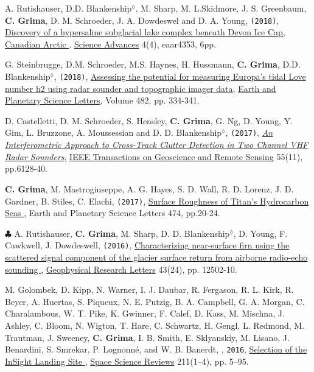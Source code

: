 \begin{etaremune}
\item
  A. Rutishauser, D.D. Blankenship$^\lozenge$, M. Sharp, M. L.Skidmore, J. S. Greenbaum, \textbf{C. Grima}, D. M. Schroeder, J. A. Dowdeswel and D. A. Young, \texttt{(2018)}, \href{http://advances.sciencemag.org/content/4/4/eaar4353}{Discovery of a hypersaline subglacial lake complex beneath Devon Ice Cap, Canadian Arctic \aiOpenAccessSquare}. \ul{Science Advances} 4(4), eaar4353, 6pp.
  
\item
  G. Steinbrugge, D.M. Schroeder, M.S. Haynes, H. Hussmann, \textbf{C. Grima}, D.D. Blankenship$^\lozenge$, \texttt{(2018)}, \href{https://www.sciencedirect.com/science/article/pii/S0012821X17306647}{Assessing the potential for measuring Europa's tidal Love number h2 using radar sounder and topographic imager data}, \ul{Earth and Planetary Science Letters}, Volume 482, pp. 334-341.
  
\item
  D. Castelletti, D. M. Schroeder, S. Hensley, \textbf{C. Grima}, G. Ng, D. Young, Y. Gim, L. Bruzzone, A. Moussessian and D. D. Blankenship$^\lozenge$, \texttt{(2017)}, \href{http://ieeexplore.ieee.org/abstract/document/8012547/}{\emph{An Interferometric Approach to Cross-Track Clutter Detection in Two Channel VHF Radar Sounders}}, \ul{IEEE Transactions on Geoscience and Remote Sensing} 55(11), pp.6128-40.

\item
  \textbf{C. Grima}, M. Mastrogiuseppe, A. G. Hayes, S. D. Wall, R. D. Lorenz, J. D. Gardner, B. Stiles, C. Elachi, \texttt{(2017)}, \href{http://www.sciencedirect.com/science/article/pii/S0012821X17303163}{Surface Roughness of Titan's Hydrocarbon Seas \aiOpenAccessSquare}, Earth and Planetary Science Letters 474, pp.20-24.
  
\item
  $\clubsuit$ A. Rutishauser, \textbf{C. Grima}, M. Sharp, D. D. Blankenship$^\lozenge$, D. Young, F. Cawkwell, J. Dowdeswell, \texttt{(2016)}, \href{http://onlinelibrary.wiley.com/doi/10.1002/2016GL071230/full}{Characterizing near-surface firn using the scattered signal component of the glacier surface return from airborne radio-echo sounding \aiOpenAccessSquare}, \ul{Geophysical Research Letters} 43(24), pp. 12502-10.
  
\item
  M. Golombek, D. Kipp, N. Warner, I. J. Daubar, R. Fergason, R. L. Kirk, R. Beyer, A. Huertas, S. Piqueux, N. E. Putzig, B. A. Campbell, G. A. Morgan, C. Charalambous, W. T. Pike, K. Gwinner, F. Calef, D. Kass, M. Mischna, J. Ashley, C. Bloom, N. Wigton, T. Hare, C. Schwartz, H. Gengl, L. Redmond, M. Trautman, J. Sweeney, \textbf{C. Grima}, I. B. Smith, E. Sklyanskiy, M. Lisano, J. Benardini, S. Smrekar, P. Lognonné, and W. B. Banerdt, , \texttt{2016}, \href{http://link.springer.com/article/10.1007/s11214-016-0321-9?wt_mc=Internal.Event.1.SEM.ArticleAuthorOnlineFirst}{Selection of the InSight Landing Site \aiOpenAccessSquare}, \ul{Space Science Reviews} 211(1–4), pp. 5–95.


\end{etaremune}
